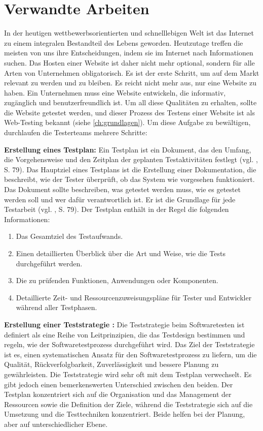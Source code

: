 \section{Verwandte Arbeiten}

In der heutigen wettbewerbsorientierten und schnelllebigen
Welt ist das Internet zu einem integralen Bestandteil des Lebens
geworden. Heutzutage treffen die meisten von uns ihre Entscheidungen,
indem sie im Internet nach Informationen suchen. Das Hosten einer
Website ist daher nicht mehr optional, sondern für alle Arten von
Unternehmen obligatorisch. Es ist der erste Schritt, um auf dem
Markt relevant zu werden und zu bleiben. Es reicht nicht mehr aus,
nur eine Website zu haben. Ein Unternehmen muss eine Website
entwickeln, die informativ, zugänglich und benutzerfreundlich ist.
Um all diese Qualitäten zu erhalten, sollte die Website getestet
werden, und dieser Prozess des Testens einer Website ist als Web-Testing
bekannt (siehe \autoref{ch:grundlagen}). Um diese Aufgabe zu bewältigen,
durchlaufen die Testerteams mehrere Schritte:


\textbf{Erstellung eines Testplan:} Ein Testplan ist ein Dokument, das den
Umfang, die Vorgehensweise und den Zeitplan der geplanten Testaktivitäten
festlegt (vgl. \cite{shultz2011software}, S. 79). Das Hauptziel eines Testplans
ist die Erstellung einer Dokumentation, die beschreibt, wie der Tester
überprüft, ob das System wie vorgesehen funktioniert. Das Dokument sollte
beschreiben, was getestet werden muss, wie es getestet werden soll und wer
dafür verantwortlich ist. Er ist die Grundlage für jede Testarbeit
(vgl. \cite{shultz2011software}, S. 79). Der Testplan enthält in der Regel die
folgenden Informationen:

\begin{enumerate}
    \item Das Gesamtziel des Testaufwands.
    \item Einen detaillierten Überblick über die Art und Weise, wie die Tests
    durchgeführt werden.
    \item Die zu prüfenden Funktionen, Anwendungen oder Komponenten.
    \item Detaillierte Zeit- und Ressourcenzuweisungspläne für Tester und
    Entwickler während aller Testphasen.
\end{enumerate}

\textbf{Erstellung einer Teststrategie :} Die Teststrategie beim Softwaretesten
ist definiert als eine Reihe von Leitprinzipien, die das Testdesign
bestimmen und regeln, wie der Softwaretestprozess durchgeführt wird. Das Ziel
der Teststrategie ist es, einen systematischen Ansatz für den
Softwaretestprozess zu liefern, um die Qualität, Rückverfolgbarkeit,
Zuverlässigkeit und bessere Planung zu gewährleisten. Die
Teststrategie wird sehr oft mit dem Testplan verwechselt. Es gibt jedoch einen
bemerkenswerten Unterschied zwischen den beiden. Der Testplan konzentriert
sich auf die Organisation und das Management der Ressourcen sowie die
Definition der Ziele, während die Teststrategie sich auf die Umsetzung und die
Testtechniken konzentriert. Beide helfen bei der Planung, aber auf
unterschiedlicher Ebene.

